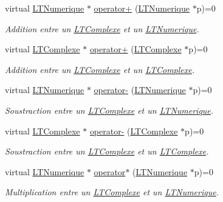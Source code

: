 \begin{DoxyCompactItemize}
\item 
virtual \hyperlink{class_l_t_numerique}{L\+T\+Numerique} $\ast$ \hyperlink{class_l_t_numerique_a9fb09223dc517fae452f4af0d50f6966}{operator+} (\hyperlink{class_l_t_numerique}{L\+T\+Numerique} $\ast$p)=0
\begin{DoxyCompactList}\small\item\em Addition entre un \hyperlink{class_l_t_complexe}{L\+T\+Complexe} et un \hyperlink{class_l_t_numerique}{L\+T\+Numerique}. \end{DoxyCompactList}\item 
virtual \hyperlink{class_l_t_complexe}{L\+T\+Complexe} $\ast$ \hyperlink{class_l_t_numerique_a615173a7cd77e649235d1c06d72726e7}{operator+} (\hyperlink{class_l_t_complexe}{L\+T\+Complexe} $\ast$p)=0
\begin{DoxyCompactList}\small\item\em Addition entre un \hyperlink{class_l_t_complexe}{L\+T\+Complexe} et un \hyperlink{class_l_t_complexe}{L\+T\+Complexe}. \end{DoxyCompactList}\item 
virtual \hyperlink{class_l_t_numerique}{L\+T\+Numerique} $\ast$ \hyperlink{class_l_t_numerique_a94d98eef8d391bdb925dbb70a1b35834}{operator-\/} (\hyperlink{class_l_t_numerique}{L\+T\+Numerique} $\ast$p)=0
\begin{DoxyCompactList}\small\item\em Soustraction entre un \hyperlink{class_l_t_complexe}{L\+T\+Complexe} et un \hyperlink{class_l_t_numerique}{L\+T\+Numerique}. \end{DoxyCompactList}\item 
virtual \hyperlink{class_l_t_complexe}{L\+T\+Complexe} $\ast$ \hyperlink{class_l_t_numerique_a45bbf62a5725c3b9c8a8a14d9be6ef47}{operator-\/} (\hyperlink{class_l_t_complexe}{L\+T\+Complexe} $\ast$p)=0
\begin{DoxyCompactList}\small\item\em Soustraction entre un \hyperlink{class_l_t_complexe}{L\+T\+Complexe} et un \hyperlink{class_l_t_complexe}{L\+T\+Complexe}. \end{DoxyCompactList}\item 
virtual \hyperlink{class_l_t_numerique}{L\+T\+Numerique} $\ast$ \hyperlink{class_l_t_numerique_aef374b7679c6b9b7901e0a4bbfce4cc3}{operator$\ast$} (\hyperlink{class_l_t_numerique}{L\+T\+Numerique} $\ast$p)=0
\begin{DoxyCompactList}\small\item\em Multiplication entre un \hyperlink{class_l_t_complexe}{L\+T\+Complexe} et un \hyperlink{class_l_t_numerique}{L\+T\+Numerique}. \end{DoxyCompactList}\item 

\end{DoxyCompactItemize}
